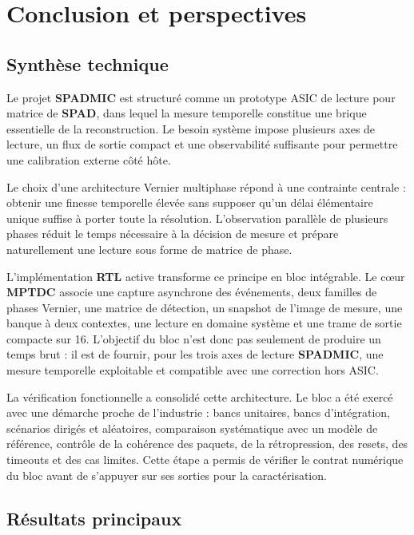\chapter{Conclusion et perspectives}
\label{chap:conclusion-perspectives}
\justifying
\sloppy

\section{Synthèse technique}

Le projet \textbf{SPADMIC} est structuré comme un prototype ASIC de lecture pour matrice de \textbf{SPAD}, dans lequel la mesure temporelle constitue une brique essentielle de la reconstruction. Le besoin système impose plusieurs axes de lecture, un flux de sortie compact et une observabilité suffisante pour permettre une calibration externe côté hôte.

Le choix d'une architecture Vernier multiphase répond à une contrainte centrale : obtenir une finesse temporelle élevée sans supposer qu'un délai élémentaire unique suffise à porter toute la résolution. L'observation parallèle de plusieurs phases réduit le temps nécessaire à la décision de mesure et prépare naturellement une lecture sous forme de matrice de phase.

L'implémentation \textbf{RTL} active transforme ce principe en bloc intégrable. Le cœur \textbf{MPTDC} associe une capture asynchrone des événements, deux familles de phases Vernier, une matrice de détection, un snapshot de l'image de mesure, une banque à deux contextes, une lecture en domaine système et une trame de sortie compacte sur \SI{16}{\bit}. L'objectif du bloc n'est donc pas seulement de produire un temps brut : il est de fournir, pour les trois axes de lecture \textbf{SPADMIC}, une mesure temporelle exploitable et compatible avec une correction hors ASIC.

La vérification fonctionnelle a consolidé cette architecture. Le bloc a été exercé avec une démarche proche de l'industrie : bancs unitaires, bancs d'intégration, scénarios dirigés et aléatoires, comparaison systématique avec un modèle de référence, contrôle de la cohérence des paquets, de la rétropression, des resets, des timeouts et des cas limites. Cette étape a permis de vérifier le contrat numérique du bloc avant de s'appuyer sur ses sorties pour la caractérisation.

\section{Résultats principaux}

